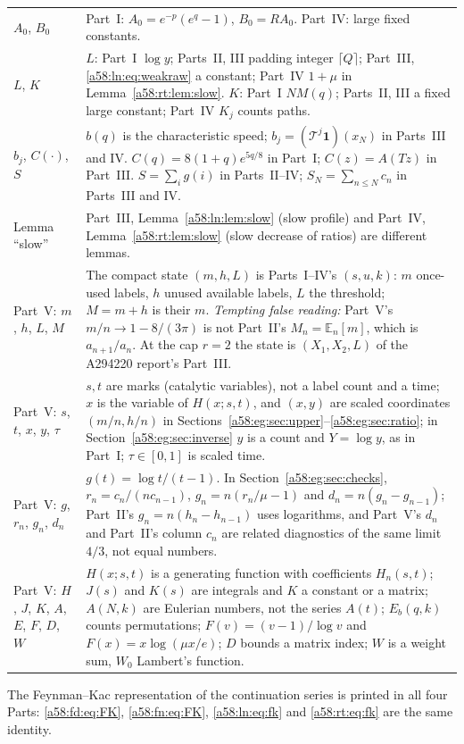 \documentclass[11pt,letterpaper]{article}
\theoremstyle{remark}
\newcommand{\TT}{\mathcal T}
\newcommand{\one}{\mathbf 1}
\newcommand{\E}{\mathbb E}
\begin{document}
\begin{center}
\begin{tabular}{@{}>{\raggedright\arraybackslash}p{} >{\raggedright\arraybackslash}p{}@{}}
$A_0$, $B_0$ & Part~I: $A_0=e^{-p}(e^q-1)$, $B_0=RA_0$. Part~IV: large fixed constants.\\
$L$, $K$ & $L$: Part~I $\log y$; Parts~II, III padding integer $\lceil Q\rceil$; Part~III, \eqref{a58:ln:eq:weakraw} a constant; Part~IV $1+\mu$ in Lemma~\ref{a58:rt:lem:slow}. $K$: Part~I $NM(q)$; Parts~II, III a fixed large constant; Part~IV $K_j$ counts paths.\\
$b_j$, $C(\cdot)$, $S$ & $b(q)$ is the characteristic speed; $b_j=(\TT^j\one)(x_N)$ in Parts~III and IV. $C(q)=8(1+q)e^{5q/8}$ in Part~I; $C(z)=A(Tz)$ in Part~III. $S=\sum_ig(i)$ in Parts~II--IV; $S_N=\sum_{n\le N}c_n$ in Parts~III and IV.\\
Lemma ``slow'' & Part~III, Lemma~\ref{a58:ln:lem:slow} (slow profile) and Part~IV, Lemma~\ref{a58:rt:lem:slow} (slow decrease of ratios) are different lemmas.\\
\midrule
Part~V: $m$, $h$, $L$, $M$ & The compact state $(m,h,L)$ is Parts~I--IV's $(s,u,k)$: $m$ once-used labels, $h$ unused available labels, $L$ the threshold; $M=m+h$ is their $m$. \emph{Tempting false reading:} Part~V's $m/n\to1-8/(3\pi)$ is not Part~II's $M_n=\E_n[m]$, which is $a_{n+1}/a_n$. At the cap $r=2$ the state is $(X_1,X_2,L)$ of the A294220 report's Part~III.\\
Part~V: $s$, $t$, $x$, $y$, $\tau$ & $s,t$ are marks (catalytic variables), not a label count and a time; $x$ is the variable of $H(x;s,t)$, and $(x,y)$ are scaled coordinates $(m/n,h/n)$ in Sections~\ref{a58:eg:sec:upper}--\ref{a58:eg:sec:ratio}; in Section~\ref{a58:eg:sec:inverse} $y$ is a count and $Y=\log y$, as in Part~I; $\tau\in[0,1]$ is scaled time.\\
Part~V: $g$, $r_n$, $g_n$, $d_n$ & $g(t)=\log t/(t-1)$. In Section~\ref{a58:eg:sec:checks}, $r_n=c_n/(nc_{n-1})$, $g_n=n(r_n/\mu-1)$ and $d_n=n(g_n-g_{n-1})$; Part~II's $g_n=n(h_n-h_{n-1})$ uses logarithms, and Part~V's $d_n$ and Part~II's column $c_n$ are related diagnostics of the same limit $4/3$, not equal numbers.\\
Part~V: $H$, $J$, $K$, $A$, $E$, $F$, $D$, $W$ & $H(x;s,t)$ is a generating function with coefficients $H_n(s,t)$; $J(s)$ and $K(s)$ are integrals and $K$ a constant or a matrix; $A(N,k)$ are Eulerian numbers, not the series $A(t)$; $E_b(q,k)$ counts permutations; $F(v)=(v-1)/\log v$ and $F(x)=x\log(\mu x/e)$; $D$ bounds a matrix index; $W$ is a weight sum, $W_0$ Lambert's function.\\
\bottomrule
\end{tabular}
\end{center}
The Feynman--Kac representation of the continuation series is printed in all four Parts: \eqref{a58:fd:eq:FK}, \eqref{a58:fn:eq:FK}, \eqref{a58:ln:eq:fk} and \eqref{a58:rt:eq:fk} are the same identity.
\end{document}
